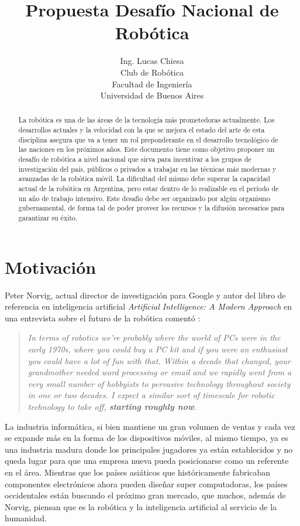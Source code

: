 \documentclass[a4paper,12pt]{article}
\author{Ing. Lucas Chiesa \\ Club de Robótica \\ Facultad de Ingeniería \\ Universidad de Buenos Aires}
\title{Propuesta Desafío Nacional de Robótica}
\begin{document}


\begin{abstract}
 La robótica es una de las áreas de la tecnología más prometedoras actualmente. Los desarrollos actuales y la velocidad con la que se mejora el estado del arte de esta disciplina asegura que va a tener un rol preponderante en el desarrollo tecnológico de las naciones en los próximos años.
 Este documento tiene como objetivo proponer un desafío de robótica a nivel nacional que sirva para incentivar a los grupos de investigación del país, públicos o privados a trabajar en las técnicas más modernas y avanzadas de la robótica móvil. La dificultad del mismo debe superar la capacidad actual de la robótica en Argentina, pero estar dentro de lo realizable en el período de un año de trabajo intensivo. Este desafío debe ser organizado por algún organismo gubernamental, de forma tal de poder proveer los recursos y la difusión necesarios para garantizar su éxito.
\end{abstract}

\newpage
\section{Motivación}

Peter Norvig\cite{norvig-cv}, actual director de investigación para Google y autor del libro de referencia en inteligencia artificial \textit{Artificial Intelligence: A Modern Approach} en una entrevista sobre el futuro de la robótica comentó \cite{norvig-cita}:

\begin{quote}
\textit{In terms of robotics we're probably where the world of PCs were in the early 1970s, where you could buy a PC kit and if you were an enthusiast you could have a lot of fun with that. Within a decade that changed, your grandmother needed word processing or email and we rapidly went from a very small number of hobbyists to pervasive technology throughout society in one or two decades. I expect a similar sort of timescale for robotic technology to take off, \textbf{starting roughly now}.}
\end{quote}

La industria informática, si bien mantiene un gran volumen de ventas y cada vez se expande más en la forma de los dispositivos móviles, al mismo tiempo, ya es una industria madura donde los principales jugadores ya están establecidos y no queda lugar para que una empresa nueva pueda posicionarse como un referente en el área. Mientras que los países asiáticos que históricamente fabricaban componentes electrónicos ahora pueden diseñar super computadoras\cite{spectrum-china}, los países occidentales están buscando el próximo gran mercado, que muchos, además de Norvig, piensan que es la robótica y la inteligencia artificial al servicio de la humanidad\cite{ros-spur}\cite{redwood}\cite{wg-irobot}.
\end{document}
